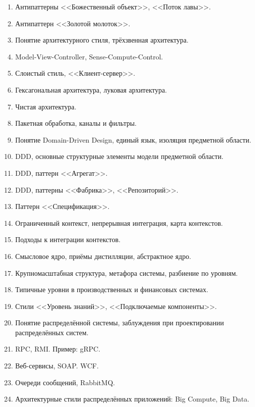 \documentclass[a5paper]{article}
\begin{document}
\begin{enumerate}
    \item Антипаттерны <<Божественный объект>>, <<Поток лавы>>.
    \item Антипаттерн <<Золотой молоток>>.
    \item Понятие архитектурного стиля, трёхзвенная архитектура.
    \item Model-View-Controller, Sense-Compute-Control.
    \item Слоистый стиль, <<Клиент-сервер>>.
    \item Гексагональная архитектура, луковая архитектура.
    \item Чистая архитектура.
    \item Пакетная обработка, каналы и фильтры. %
    \item Понятие Domain-Driven Design, единый язык, изоляция предметной области.
    \item DDD, основные структурные элементы модели предметной области.
    \item DDD, паттерн <<Агрегат>>.
    \item DDD, паттерны <<Фабрика>>, <<Репозиторий>>.
    \item Паттерн <<Спецификация>>.
	\item Ограниченный контекст, непрерывная интеграция, карта контекстов.
    \item Подходы к интеграции контекстов.
    \item Смысловое ядро, приёмы дистилляции, абстрактное ядро.
    \item Крупномасштабная структура, метафора системы, разбиение по уровням. 
    \item Типичные уровни в производственных и финансовых системах.
    \item Стили <<Уровень знаний>>, <<Подключаемые компоненты>>.
    \item Понятие распределённой системы, заблуждения при проектировании распределённых систем.
    \item RPC, RMI. Пример: gRPC.
    \item Веб-сервисы, SOAP. WCF.
    \item Очереди сообщений, RabbitMQ.
    \item Архитектурные стили распределённых приложений: Big Compute, Big Data.

\end{enumerate}
\end{document}
